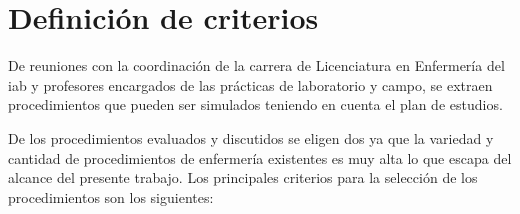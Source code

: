 \section{Definición de criterios}
\label{sec:criterios}

De reuniones con la 
coordinación de la carrera de Licenciatura
en Enfermería del \Gls{iab} y profesores encargados de las prácticas de
laboratorio y campo, se extraen procedimientos que
pueden ser simulados teniendo en cuenta el plan de estudios. 

De los procedimientos evaluados y discutidos se eligen dos ya que la variedad y
cantidad de procedimientos de enfermería existentes es muy alta lo que escapa
del alcance del presente trabajo. Los principales criterios para la selección de los 
procedimientos son los siguientes:

